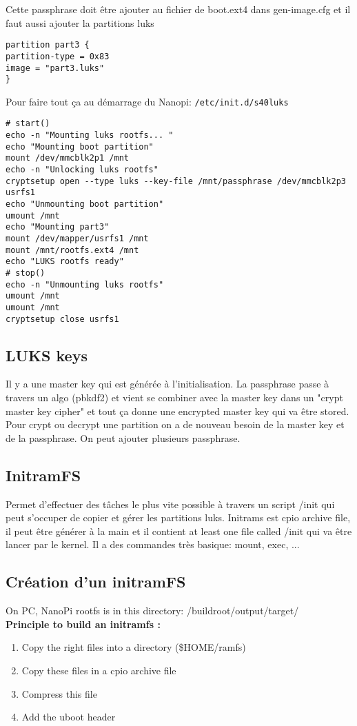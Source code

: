 Cette passphrase doit être ajouter au fichier de boot.ext4 dans gen-image.cfg et il faut aussi ajouter la partitions luks
\begin{Verbatim}[breaklines=true, breakanywhere=true]
partition part3 {
partition-type = 0x83
image = "part3.luks"
}
\end{Verbatim}
Pour faire tout ça au démarrage du Nanopi: \verb!/etc/init.d/s40luks!
\begin{Verbatim}[breaklines=true, breakanywhere=true]
# start()
echo -n "Mounting luks rootfs... "
echo "Mounting boot partition"
mount /dev/mmcblk2p1 /mnt
echo -n "Unlocking luks rootfs"
cryptsetup open --type luks --key-file /mnt/passphrase /dev/mmcblk2p3
usrfs1
echo "Unmounting boot partition"
umount /mnt
echo "Mounting part3"
mount /dev/mapper/usrfs1 /mnt
mount /mnt/rootfs.ext4 /mnt
echo "LUKS rootfs ready"
# stop()
echo -n "Unmounting luks rootfs"
umount /mnt
umount /mnt
cryptsetup close usrfs1
\end{Verbatim}
\subsection{LUKS keys}
Il y a une master key qui est générée à l'initialisation. La passphrase passe à travers un algo (pbkdf2) et vient se combiner avec la master key dans un "crypt master key cipher" et tout ça donne une encrypted master key qui va être stored. Pour crypt ou decrypt une partition on a de nouveau besoin de la master key et de la passphrase. On peut ajouter plusieurs passphrase.

\subsection{InitramFS}
Permet d'effectuer des tâches le plus vite possible à travers un script /init qui peut s'occuper de copier et gérer les partitions luks. Initrams est cpio archive file, il peut être générer à la main et il contient at least one file called /init qui va être lancer par le kernel. Il a des commandes très basique: mount, exec, ...

\subsection{Création d'un initramFS}
On PC, NanoPi rootfs is in this directory: /buildroot/output/target/\\
\textbf{Principle to build an initramfs :}
\begin{enumerate}
\item Copy the right files into a directory (\$HOME/ramfs)
\item Copy these files in a cpio archive file
\item Compress this file
\item Add the uboot header
\end{enumerate}
